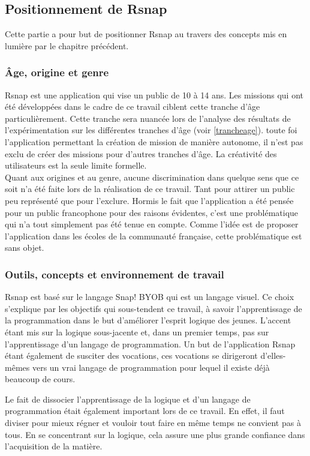 ﻿\subsection{Positionnement de Rsnap}
Cette partie a pour but de positionner Rsnap au travers des concepts mis en lumière par le chapitre précédent.

\subsubsection{Âge, origine et genre} 
Rsnap est une application qui vise un public de 10 à 14 ans. Les missions qui ont été développées dans le cadre de ce travail ciblent cette tranche d'âge particulièrement. Cette tranche sera nuancée lors de l'analyse des résultats de l'expérimentation sur les différentes tranches d'âge (voir \ref{trancheage}). %
toute foi l'application permettant la création de mission de manière autonome, il n'est pas exclu de créer des missions pour d'autres tranches d'âge. La créativité des utilisateurs est la seule limite formelle.\\

Quant aux origines et au genre, aucune discrimination dans quelque sens que ce soit n'a été faite lors de la réalisation de ce travail. Tant pour attirer un public peu représenté que pour l'exclure. Hormis le fait que l'application a été pensée pour un public francophone pour des raisons évidentes, c'est une problématique qui n'a tout simplement pas été tenue en compte. Comme l'idée est de proposer l'application dans les écoles de la communauté française, cette problématique est sans objet.

\subsubsection{Outils, concepts et environnement de travail} 
Rsnap est basé sur le langage Snap! BYOB qui est un langage visuel. Ce choix s'explique par les objectifs qui sous-tendent ce travail, à savoir l'apprentissage de la programmation dans le but d'améliorer l'esprit logique des jeunes. L'accent étant mis sur la logique sous-jacente et, dans un premier temps, pas sur l'apprentissage d'un langage de programmation. Un but de l'application Rsnap étant également de susciter des vocations, ces vocations se dirigeront d'elles-mêmes vers un vrai langage de programmation pour lequel il existe déjà beaucoup de cours. 

Le fait de dissocier l'apprentissage de la logique et d'un langage de programmation était également important lors de ce travail. En effet, il faut diviser pour mieux régner et vouloir tout faire en même temps ne convient pas à tous. En se concentrant sur la logique, cela assure une plus grande confiance dans l'acquisition de la matière.

